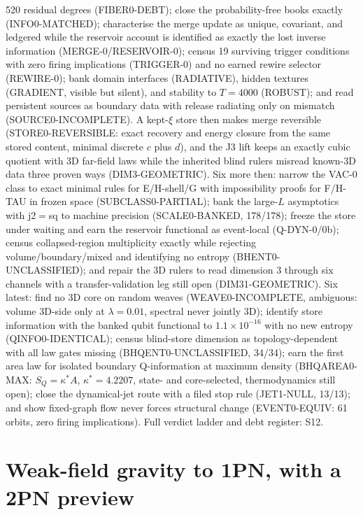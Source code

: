 \documentclass[11pt]{article}
\begin{document}
520 residual degrees (FIBER0-DEBT); close the probability-free books exactly
(INFO0-MATCHED); characterise the merge update as unique, covariant, and
ledgered while the reservoir account is identified as exactly the lost
inverse information (MERGE-0/RESERVOIR-0); census 19 surviving trigger
conditions with zero firing implications (TRIGGER-0) and no earned rewire
selector (REWIRE-0); bank domain interfaces (RADIATIVE), hidden textures
(GRADIENT, visible but silent), and stability to $T = 4000$ (ROBUST); and
read persistent sources as boundary data with release radiating only on
mismatch (SOURCE0-INCOMPLETE). A kept-$\xi$ store then makes merge
reversible (STORE0-REVERSIBLE: exact recovery and energy closure from the
same stored content, minimal discrete $c$ plus $d$), and the J3 lift keeps
an exactly cubic quotient with 3D far-field laws while the inherited blind
rulers misread known-3D data three proven ways (DIM3-GEOMETRIC). Six more
then: narrow the VAC-0 class to exact minimal rules for E/H-shell/G with
impossibility proofs for F/H-TAU in frozen space (SUBCLASS0-PARTIAL); bank
the large-$L$ asymptotics with j2${}={}$sq to machine precision
(SCALE0-BANKED, 178/178); freeze the store under waiting and earn the
reservoir functional as event-local (Q-DYN-0/0b); census collapsed-region
multiplicity exactly while rejecting volume/boundary/mixed and identifying
no entropy (BHENT0-UNCLASSIFIED); and repair the 3D rulers to read dimension
3 through six channels with a transfer-validation leg still open
(DIM31-GEOMETRIC). Six latest: find no 3D core on random weaves
(WEAVE0-INCOMPLETE, ambiguous: volume 3D-side only at $\lambda = 0.01$,
spectral never jointly 3D); identify store information with the banked
qubit functional to $1.1\times10^{-16}$ with no new entropy
(QINFO0-IDENTICAL); census blind-store dimension as topology-dependent
with all law gates missing (BHQENT0-UNCLASSIFIED, 34/34); earn the
first area law for isolated boundary Q-information at maximum density
(BHQAREA0-MAX: $S_Q = \kappa^*A$, $\kappa^* = 4.2207$, state- and
core-selected, thermodynamics still open); close the dynamical-jet
route with a filed stop rule (JET1-NULL, 13/13); and show fixed-graph
flow never forces structural change (EVENT0-EQUIV: 61 orbits, zero
firing implications).
Full verdict ladder and debt register: S12.

\section{Weak-field gravity to 1PN, with a 2PN preview}
\label{sec:gravity}
\end{document}
